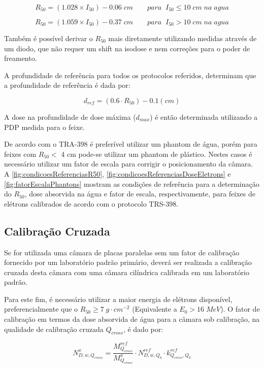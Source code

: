 \documentclass[11pt,a4paper]{article}
\begin{document}
		$$R_{50} = (1.028 \times I_{50}) - 0.06 \; cm \qquad para\; \; I_{50} \leq 10 \; cm \; na \; agua$$

		$$R_{50} = (1.059 \times I_{50}) - 0.37\;cm \qquad para\; \; I_{50} > 10 \; cm\; na \; agua$$

	Também é possível derivar o $R_{50}$ mais diretamente utilizando medidas através de um diodo, que não requer um shift na isodose e nem correções para o poder de freamento. 

	A profundidade de referência para todos os protocolos referidos, determinam que a profundidade de referência é dada por:

		$$d_{ref} = (0.6 \cdot R_{50}) - 0.1 (cm) $$

	A dose na profundidade de dose máxima ($d_{max}$) é então determinada utilizando a PDP medida para o feixe.

	De acordo com o TRA-398 é preferível utilizar um phantom de água, porém para feixes com $R_{50} <$ 4 cm pode-se utilizar um phantom de plástico. Nestes casos é necessário utilizar um fator de escala para corrigir o posicionamento da câmara.  A \ref{fig:condicoesReferenciasR50}, \ref{fig:condicoesReferenciasDoseEletrons} e \ref{fig:fatorEscalaPhantons} mostram as condições de referência para a determinação do $R_{50}$, dose absorvida na água e fator de escala, respectivamente, para feixes de elétrons calibrados de acordo com o protocolo TRS-398.
	
	\subsection{Calibração Cruzada}
	
	Se for utilizada uma câmara de placas paralelas sem um fator de calibração fornecido por um laboratório padrão primário, deverá ser realizada a calibração cruzada desta câmara com uma câmara cilíndrica calibrada em um laboratório padrão.

	Para este fim, é necessário utilizar a maior energia de elétrons disponível, preferencialmente que o  $R_{50} \geq 7\; g\cdot cm^{-2}$ (Equivalente a $E_0 > 16 \; MeV$). O fator de calibração em termos da dose absorvida de água para a câmara sob calibração, na qualidade de calibração cruzada $Q_{cross}$, é dado por:

	$$N_{D,w,Q_{cross}}^{x} = \frac{M_{Q_{cross}}^{ref}}{M_{Q_{cross}}^{x}} \cdot N_{D,w,Q_0}^{ref}\cdot k_{Q_{cross},Q_0}^{ref}$$
\end{document}

